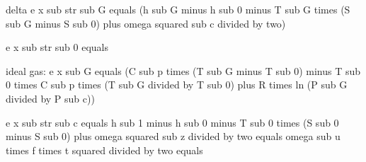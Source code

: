 delta e x sub str sub G equals (h sub G minus h sub 0 minus T sub G times (S sub G minus S sub 0) plus omega squared sub c divided by two)

e x sub str sub 0 equals

ideal gas: e x sub G equals (C sub p times (T sub G minus T sub 0) minus T sub 0 times C sub p times (T sub G divided by T sub 0) plus R times ln (P sub G divided by P sub c))

e x sub str sub c equals h sub 1 minus h sub 0 minus T sub 0 times (S sub 0 minus S sub 0) plus omega squared sub z divided by two equals omega sub u times f times t squared divided by two equals